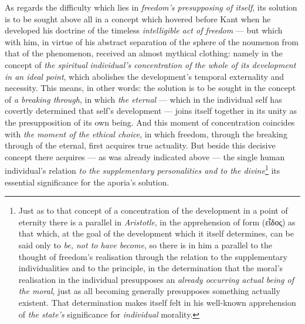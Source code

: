 \documentclass[12pt,a4paper]{book}
\begin{document}
As regards the difficulty which lies in \emph{freedom's presupposing of
itself}, its solution is to be sought above all in a concept which hovered
before Kant when he developed his doctrine of the timeless \emph{intelligible
act of freedom} --- but which with him, in virtue of his abstract separation of
the sphere of the noumenon from that of the phenomenon, received an almost
mythical clothing: namely in the concept of \emph{the spiritual}
\setcounter{footnote}{0}%
\emph{individual's concentration of the whole of its development in an ideal
point}, which abolishes the development's temporal externality and necessity.
This means, in other words: the solution is to be sought in the concept of
\emph{a breaking through}, in which \emph{the eternal} --- which in the
individual self has covertly determined that self's development --- joins
itself together in its unity as the presupposition of its own being. And this
moment of concentration coincides with \emph{the moment of the ethical choice},
in which freedom, through the breaking through of the eternal, first acquires
true actuality. But beside this decisive concept there acquires --- as was
already indicated above --- the single human individual's relation \emph{to the
supplementary personalities and to the divine}\footnote{Just as to that concept
of a concentration of the development in a point of eternity there is a
parallel in \emph{Aristotle}, in the apprehension of form (εἶδος) as that
which, at the goal of the development which it itself determines, can be said
only to \emph{be, not to have become}, so there is in him a parallel to the
thought of freedom's realisation through the relation to the supplementary
individualities and to the principle, in the determination that the moral's
realisation in the individual presupposes an \emph{already occurring actual
being of the moral}, just as all becoming generally presupposes something
actually existent. That determination makes itself felt in his well-known
apprehension of \emph{the state's} significance for \emph{individual}
morality.} its essential significance for the aporia's solution.
\end{document}
